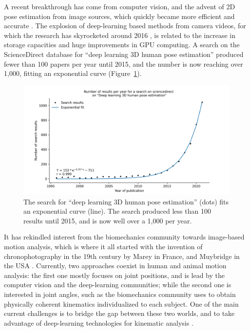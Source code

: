 A recent breakthrough has come from computer vision, and the advent of 2D pose estimation from image sources, which quickly became more efficient and accurate \cite{Mathis2020}. The explosion of deep-learning based methods from camera videos, for which the research has skyrocketed around 2016 \cite{Wang2021a}, is related to the increase in storage capacities and huge improvements in GPU computing. A search on the ScienceDirect database for “deep learning 3D human pose estimation” produced fewer than 100 papers per year until 2015, and the number is now reaching over 1,000, fitting an exponential curve (Figure~\ref{fig_exp}).

\clearpage
\begin{figure}[hbtp]
	\centering
	\def\svgwidth{1\columnwidth}
	\fontsize{10pt}{10pt}\selectfont
	\includegraphics[width=\linewidth]{"../Chap1/Figures/Fig_Exp.png"}
	\caption{The search for “deep learning 3D human pose estimation” (dots) fits an exponential curve (line). The search produced less than 100 results until 2015, and is now well over a 1,000 per year.}
	\label{fig_exp}
\end{figure}

It has rekindled interest from the biomechanics community towards image-based motion analysis, which is where it all started with the invention of chronophotography in the 19th century by Marey in France, and Muybridge in the USA \cite{Baker2007}. Currently, two approaches coexist in human and animal motion analysis: the first one mostly focuses on joint positions, and is lead by the computer vision and the deep-learning communities; while the second one is interested in joint angles, such as the biomechanics community uses to obtain physically coherent kinematics individualized to each subject. One of the main current challenges is to bridge the gap between these two worlds, and to take advantage of deep-learning technologies for kinematic analysis \cite{Cronin2021,Seethapathi2019}. 

